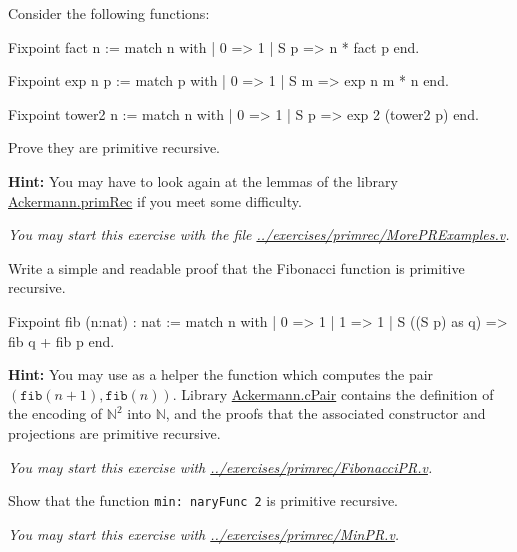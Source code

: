 \begin{exercise}
Consider the following functions:

\begin{Coqsrc}
Fixpoint fact n :=
  match n with 
          | 0 => 1
          | S p  => n * fact p
  end.

Fixpoint exp n p :=
  match p with
  | 0 => 1
  | S m =>  exp n m * n
  end.

Fixpoint tower2 n :=
  match n with
  | 0 => 1
  | S p => exp 2 (tower2 p)
  end.
\end{Coqsrc}

Prove they are primitive recursive.

\textbf{Hint:} You may have to look again at the lemmas of the library
\href{../theories/html/hydras.Ackermann.primRec.html}{Ackermann.primRec} if you meet some difficulty.

\emph{You may start this exercise with the file
\url{../exercises/primrec/MorePRExamples.v}.}
\end{exercise}








\begin{exercise}
Write a simple and readable proof that the Fibonacci function is primitive recursive.


\begin{Coqsrc}
Fixpoint fib (n:nat) : nat :=
  match n with
  | 0 => 1
  | 1 => 1
  | S ((S p) as q) => fib q + fib p
  end.
\end{Coqsrc}

\textbf{Hint:}  You may use as a helper the function which computes the pair 
$(\texttt{fib}(n+1),\texttt{fib}(n))$. 
Library \href{../theories/html/hydras.Ackermann.cPair.html}{Ackermann.cPair} contains
the definition of the encoding of $\mathbb{N}^2$ into $\mathbb{N}$, and the proofs that 
the associated constructor and projections are primitive recursive.

\emph{You may start this exercise with
\url{../exercises/primrec/FibonacciPR.v}.}

\end{exercise}

\begin{exercise}
Show that the function \texttt{min: naryFunc\,2} is primitive
recursive.

\emph{You may start this exercise with
\url{../exercises/primrec/MinPR.v}.}

\end{exercise}


